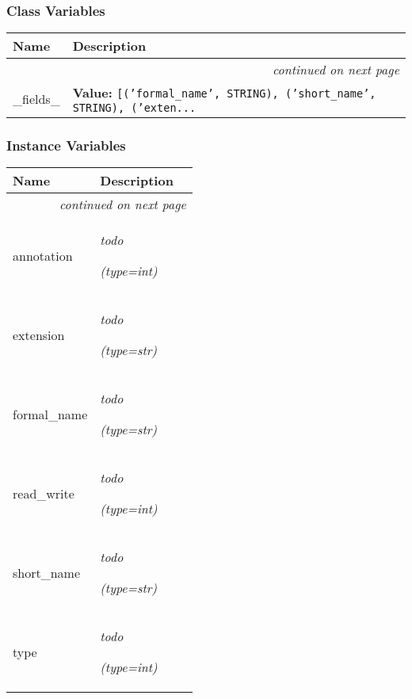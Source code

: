   \subsubsection{Class Variables}

    \vspace{-1cm}
\hspace{\varindent}\begin{longtable}{|p{\varnamewidth}|p{\vardescrwidth}|l}
\cline{1-2}
\cline{1-2} \centering \textbf{Name} & \centering \textbf{Description}& \\
\cline{1-2}
\endhead\cline{1-2}\multicolumn{3}{r}{\small\textit{continued on next page}}\\\endfoot\cline{1-2}
\endlastfoot\raggedright \_\-f\-i\-e\-l\-d\-s\-\_\- & \raggedright \textbf{Value:} 
{\tt [('formal\_name', STRING), ('short\_name', STRING), ('exten\texttt{...}}&\\
\cline{1-2}
\end{longtable}



  \subsubsection{Instance Variables}

    \vspace{-1cm}
\hspace{\varindent}\begin{longtable}{|p{\varnamewidth}|p{\vardescrwidth}|l}
\cline{1-2}
\cline{1-2} \centering \textbf{Name} & \centering \textbf{Description}& \\
\cline{1-2}
\endhead\cline{1-2}\multicolumn{3}{r}{\small\textit{continued on next page}}\\\endfoot\cline{1-2}
\endlastfoot\raggedright a\-n\-n\-o\-t\-a\-t\-i\-o\-n\- & \raggedright \emph{todo}

            {\it (type=int)}&\\
\cline{1-2}
\raggedright e\-x\-t\-e\-n\-s\-i\-o\-n\- & \raggedright \emph{todo}

            {\it (type=str)}&\\
\cline{1-2}
\raggedright f\-o\-r\-m\-a\-l\-\_\-n\-a\-m\-e\- & \raggedright \emph{todo}

            {\it (type=str)}&\\
\cline{1-2}
\raggedright r\-e\-a\-d\-\_\-w\-r\-i\-t\-e\- & \raggedright \emph{todo}

            {\it (type=int)}&\\
\cline{1-2}
\raggedright s\-h\-o\-r\-t\-\_\-n\-a\-m\-e\- & \raggedright \emph{todo}

            {\it (type=str)}&\\
\cline{1-2}
\raggedright t\-y\-p\-e\- & \raggedright \emph{todo}

            {\it (type=int)}&\\
\cline{1-2}
\end{longtable}

